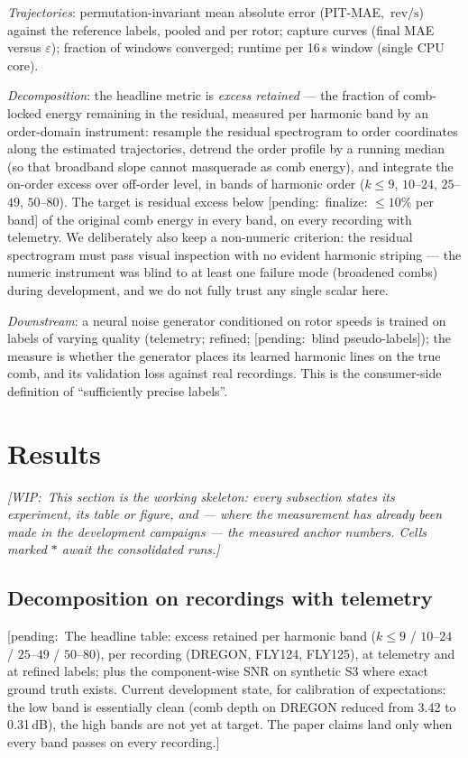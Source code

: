 \documentclass[journal]{IEEEtran}
\newcommand{\revps}{\ensuremath{\,\mathrm{rev/s}}}
\newcommand{\pending}[1]{{\color{gray}\textsf{[pending:~#1]}}}
\newcommand{\wip}[1]{{\color{gray!70!black}\textit{[WIP:~#1]}}}
\begin{document}
\emph{Trajectories}: permutation-invariant mean absolute error (PIT-MAE,
\revps) against the reference labels, pooled and per rotor; capture
curves (final MAE versus $\varepsilon$); fraction of windows converged;
runtime per 16\,s window (single CPU core).

\emph{Decomposition}: the headline metric is \emph{excess retained} ---
the fraction of comb-locked energy remaining in the residual, measured
per harmonic band by an order-domain instrument: resample the residual
spectrogram to order coordinates along the estimated trajectories,
detrend the order profile by a running median (so that broadband slope
cannot masquerade as comb energy), and integrate the on-order excess
over off-order level, in bands of harmonic order ($k \le 9$, $10$--$24$,
$25$--$49$, $50$--$80$). The target is residual excess below
\pending{finalize: $\le 10\%$ per band} of the original comb energy in
every band, on every recording with telemetry. We deliberately also keep
a non-numeric criterion: the residual spectrogram must pass visual
inspection with no evident harmonic striping --- the numeric instrument
was blind to at least one failure mode (broadened combs) during
development, and we do not fully trust any single scalar here.

\emph{Downstream}: a neural noise generator conditioned on rotor speeds
is trained on labels of varying quality (telemetry; refined;
\pending{blind pseudo-labels}); the measure is whether the generator
places its learned harmonic lines on the true comb, and its validation
loss against real recordings. This is the consumer-side definition of
``sufficiently precise labels''.

\section{Results}
\label{sec:results}

\wip{This section is the working skeleton: every subsection states its
experiment, its table or figure, and --- where the measurement has
already been made in the development campaigns --- the measured anchor
numbers. Cells marked $\ast$ await the consolidated runs.}

\subsection{Decomposition on recordings with telemetry}
\label{sec:res-decomp}

\pending{The headline table: excess retained per harmonic band
($k \le 9$ / $10$--$24$ / $25$--$49$ / $50$--$80$), per recording
(DREGON, FLY124, FLY125), at telemetry and at refined labels; plus the
component-wise SNR on synthetic S3 where exact ground truth exists.
Current development state, for calibration of expectations: the low
band is essentially clean (comb depth on DREGON reduced from 3.42 to
0.31\,dB), the high bands are not yet at target. The paper claims land
only when every band passes on every recording.}
\end{document}
